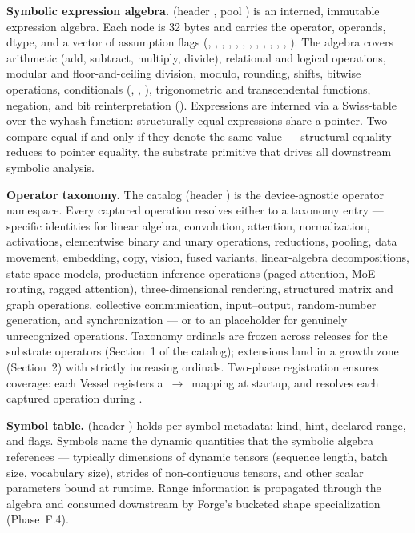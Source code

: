 \textbf{Symbolic expression algebra.}
 (header , pool ) is an interned, immutable expression algebra.
Each  node is 32 bytes and carries the operator, operands, dtype, and a vector of assumption flags (, , , , , , , , , , , , ).
The algebra covers arithmetic (add, subtract, multiply, divide), relational and logical operations, modular and floor-and-ceiling division, modulo, rounding, shifts, bitwise operations, conditionals (, , ), trigonometric and transcendental functions, negation, and bit reinterpretation ().
Expressions are interned via a Swiss-table over the wyhash function: structurally equal expressions share a pointer.
Two  compare equal if and only if they denote the same value --- structural equality reduces to pointer equality, the substrate primitive that drives all downstream symbolic analysis.

\textbf{Operator taxonomy.}
The  catalog (header ) is the device-agnostic operator namespace.
Every captured operation resolves either to a taxonomy entry --- specific identities for linear algebra, convolution, attention, normalization, activations, elementwise binary and unary operations, reductions, pooling, data movement, embedding, copy, vision, fused variants, linear-algebra decompositions, state-space models, production inference operations (paged attention, MoE routing, ragged attention), three-dimensional rendering, structured matrix and graph operations, collective communication, input--output, random-number generation, and synchronization --- or to an  placeholder for genuinely unrecognized operations.
Taxonomy ordinals are frozen across releases for the substrate operators (Section~1 of the catalog); extensions land in a growth zone (Section~2) with strictly increasing ordinals.
Two-phase registration ensures coverage: each Vessel registers a \,$\to$\, mapping at startup, and  resolves each captured operation during .

\textbf{Symbol table.}
 (header ) holds per-symbol metadata: kind, hint, declared range, and flags.
Symbols name the dynamic quantities that the symbolic algebra references --- typically dimensions of dynamic tensors (sequence length, batch size, vocabulary size), strides of non-contiguous tensors, and other scalar parameters bound at runtime.
Range information is propagated through the algebra and consumed downstream by Forge's bucketed shape specialization (Phase~F.4).

